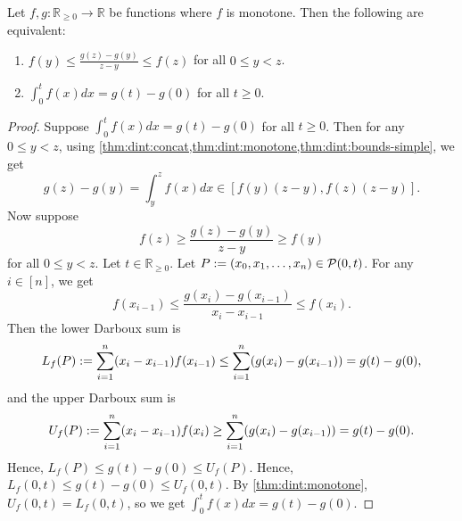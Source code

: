 \documentclass[a4paper,12pt,fleqn]{article}
\begin{document}
\begin{lemma}
\label{thm:monotone-integral-value-2}
Let $f, g: \mathbb{R}_{\ge 0} \to \mathbb{R}$ be functions where $f$ is monotone.
Then the following are equivalent:
\begin{enumerate}
\item $\displaystyle f(y) \le \frac{g(z) - g(y)}{z - y} \le f(z)$ for all $0 \le y < z$.
\item $\int_0^t f(x)dx = g(t) - g(0)$ for all $t \ge 0$.
\end{enumerate}
\end{lemma}
\begin{proof}
Suppose $\int_0^t f(x)dx = g(t) - g(0)$ for all $t \ge 0$.
Then for any $0 \le y < z$, using
\cref{thm:dint:concat,thm:dint:monotone,thm:dint:bounds-simple}, we get
\[ g(z) - g(y) = \int_y^z f(x)dx \in [f(y)(z-y), f(z)(z - y)]. \]
Now suppose
\[ f(z) \ge \frac{g(z) - g(y)}{z - y} \ge f(y) \]
for all $0 \le y < z$. Let $t \in \mathbb{R}_{\ge 0}$.
Let $P := (x_0, x_1, \ldots, x_n) \in \mathcal{P}(0, t)$.
For any $i \in [n]$, we get
\[ f(x_{i-1}) \le \frac{g(x_i) - g(x_{i-1})}{x_i - x_{i-1}} \le f(x_i). \]
Then the lower Darboux sum is
\[ L_f(P) := \sum_{i=1}^n (x_i - x_{i-1})f(x_{i-1})
\le \sum_{i=1}^n (g(x_i) - g(x_{i-1}))
= g(t) - g(0), \]
and the upper Darboux sum is
\[ U_f(P) := \sum_{i=1}^n (x_i - x_{i-1})f(x_i)
\ge \sum_{i=1}^n (g(x_i) - g(x_{i-1}))
= g(t) - g(0). \]
Hence, $L_f(P) \le g(t) - g(0) \le U_f(P)$.
Hence, $L_f(0, t) \le g(t) - g(0) \le U_f(0, t)$.
By \cref{thm:dint:monotone}, $U_f(0, t) = L_f(0, t)$,
so we get $\int_0^t f(x)dx = g(t) - g(0)$.
\end{proof}
\end{document}
